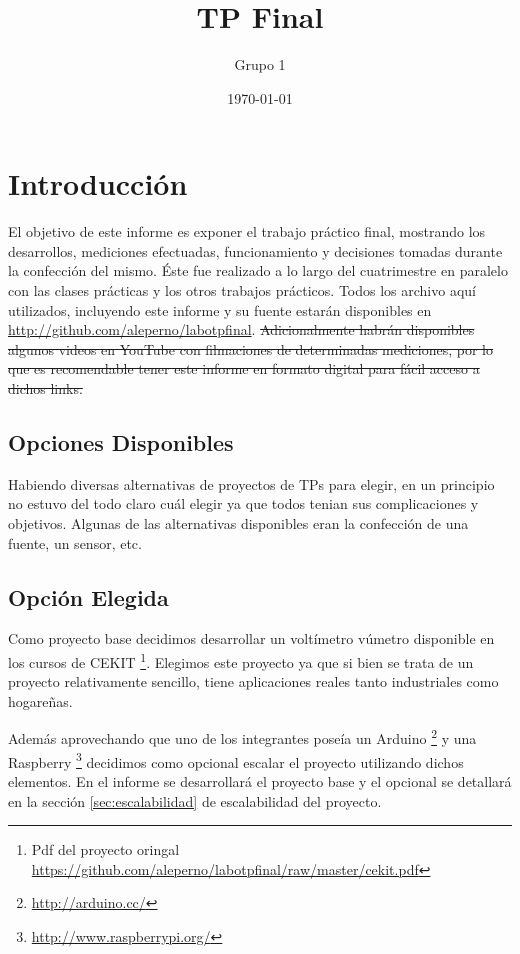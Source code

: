 \documentclass[12pt,a4paper]{article}
\title{TP Final}
\author{
        Grupo 1
}
\date{\today}
\begin{document}


\maketitle

\newpage
\tableofcontents

\newpage


\newpage 
\section{Introducción}
	El objetivo de este informe es exponer el trabajo práctico final, mostrando los desarrollos, mediciones efectuadas, funcionamiento y decisiones tomadas durante la confección del mismo. Éste fue realizado a lo largo del cuatrimestre en paralelo con las clases prácticas y los otros trabajos prácticos. Todos los archivo aquí utilizados, incluyendo este informe y su fuente estarán disponibles en \url{http://github.com/aleperno/labotpfinal}. \sout{Adicionalmente habrán disponibles algunos videos en YouTube con filmaciones de determinadas mediciones, por lo que es recomendable tener este informe en formato digital para fácil acceso a dichos links.}

	\subsection{Opciones Disponibles}
		Habiendo diversas alternativas de proyectos de TPs para elegir, en un principio no estuvo del todo claro cuál elegir ya que todos tenian sus complicaciones y objetivos. Algunas de las alternativas disponibles eran la confección de una fuente, un sensor, etc.

	\subsection{Opción Elegida}
		Como proyecto base decidimos desarrollar un voltímetro vúmetro disponible en los cursos de CEKIT \footnote{Pdf del proyecto oringal \url{https://github.com/aleperno/labotpfinal/raw/master/cekit.pdf}}. Elegimos este proyecto ya que si bien se trata de un proyecto relativamente sencillo, tiene aplicaciones reales tanto industriales como hogareñas.

		Además aprovechando que uno de los integrantes poseía un Arduino \footnote{\url{http://arduino.cc/}} y una Raspberry \footnote{\url{http://www.raspberrypi.org/}} decidimos como opcional escalar el proyecto utilizando dichos elementos. En el informe se desarrollará el proyecto base y el opcional se detallará en la sección \ref{sec:escalabilidad} de escalabilidad del proyecto.
\end{document}
